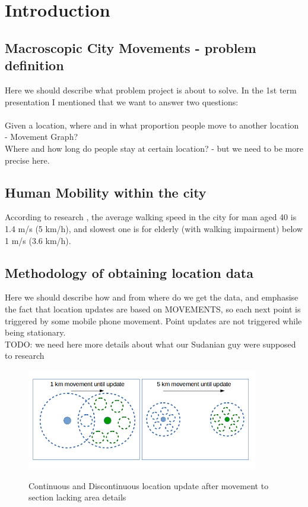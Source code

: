 \chapter{Introduction}
\label{cha:introduction}

\section{Macroscopic City Movements - problem definition}
\label{cha:introduction_probdef}

Here we should describe what problem project is about to solve. In the 1st term presentation I mentioned that we want to answer two questions:
\\
\\
Given a location, where and in what proportion people move to another location - Movement Graph? 
\\
Where and how long do people stay at certain location? - but we need to be more precise here.

\FloatBarrier

\section{Human Mobility within the city}
\label{cha:introduction_hummob}

According to research \cite{HumanMobility1}\cite{HumanMobility2}\cite{HumanMobility3}, the average walking speed in the city for man aged 40 is 1.4 m/s (5 km/h), and slowest one is for elderly (with walking impairment) below 1 m/s (3.6 km/h). 

\FloatBarrier

\section{Methodology of obtaining location data}
\label{cha:introduction_methodo}

Here we should describe how and from where do we get the data, and emphasise the fact that location updates are based on MOVEMENTS, so each next point is triggered by some mobile phone movement. Point updates are not triggered while being stationary.
\\
TODO: we need here more details about what our Sudanian guy were supposed to research
\begin{figure}[!ht]
	\centering
	\includegraphics[width=0.9\textwidth]{images/movement_update.png}\\
	\caption{Continuous and Discontinuous location update after movement to section lacking area details  }
	\label{fig:introduction_movement_update}
\end{figure}
\FloatBarrier

